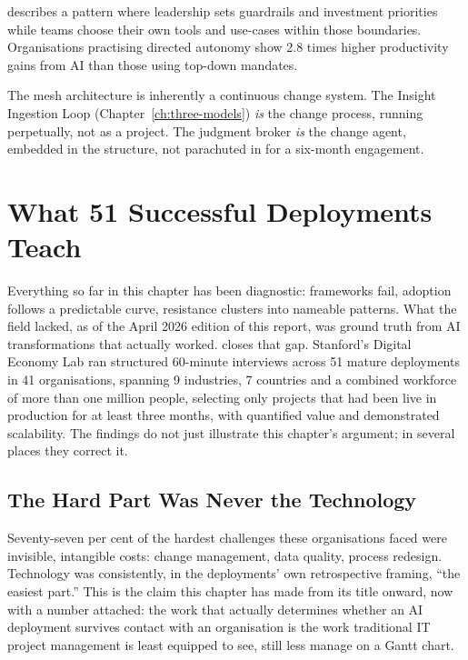 \textcite{MicrosoftDirectedAutonomy2025} describes a pattern where leadership sets guardrails and investment priorities while teams choose their own tools and use-cases within those boundaries. Organisations practising directed autonomy show 2.8 times higher productivity gains from AI than those using top-down mandates.

\begin{keyinsight}
The mesh architecture is inherently a continuous change system. The Insight Ingestion Loop (Chapter~\ref{ch:three-models}) \emph{is} the change process, running perpetually, not as a project. The judgment broker \emph{is} the change agent, embedded in the structure, not parachuted in for a six-month engagement.
\end{keyinsight}

\section{What 51 Successful Deployments Teach}

Everything so far in this chapter has been diagnostic: frameworks fail, adoption follows a predictable curve, resistance clusters into nameable patterns. What the field lacked, as of the April 2026 edition of this report, was ground truth from AI transformations that actually worked. \textcite{Pereira2026Playbook} closes that gap. Stanford's Digital Economy Lab ran structured 60-minute interviews across 51 mature deployments in 41 organisations, spanning 9 industries, 7 countries and a combined workforce of more than one million people, selecting only projects that had been live in production for at least three months, with quantified value and demonstrated scalability. The findings do not just illustrate this chapter's argument; in several places they correct it.

\subsection{The Hard Part Was Never the Technology}

Seventy-seven per cent of the hardest challenges these organisations faced were invisible, intangible costs: change management, data quality, process redesign. Technology was consistently, in the deployments' own retrospective framing, ``the easiest part.'' This is the claim this chapter has made from its title onward, now with a number attached: the work that actually determines whether an AI deployment survives contact with an organisation is the work traditional IT project management is least equipped to see, still less manage on a Gantt chart.

